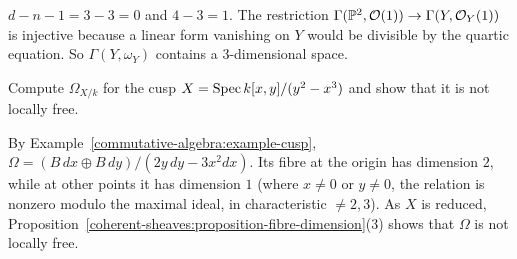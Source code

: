 \begin{solution}
$d - n - 1 = 3 - 3 = 0$ and $4 - 3 = 1$. The restriction $\Gamma(\mathbb{P}^2, \mathcal{O}(1)) \to \Gamma(Y, \mathcal{O}_Y(1))$ is injective because a linear form vanishing on $Y$
would be divisible by the quartic equation. So $\Gamma(Y, \omega_Y)$ contains a $3$-dimensional space.
\end{solution}

\begin{exercise}\label{coherent-sheaves:exercise-differentials-cusp}
Compute $\Omega_{X/k}$ for the cusp $X = \operatorname{Spec} k[x, y]/(y^2 - x^3)$ and show that it is not locally free.
\end{exercise}

\begin{solution}
By Example~\ref{commutative-algebra:example-cusp}, $\Omega = (B\,dx \oplus B\,dy)/(2y\,dy - 3x^2dx)$. Its fibre at the origin has dimension $2$, while at other
points it has dimension $1$ (where $x \neq 0$ or $y \neq 0$, the relation is nonzero modulo the maximal ideal, in characteristic $\neq 2, 3$). As $X$ is
reduced, Proposition~\ref{coherent-sheaves:proposition-fibre-dimension}(3) shows that $\Omega$ is not locally free.
\end{solution}

